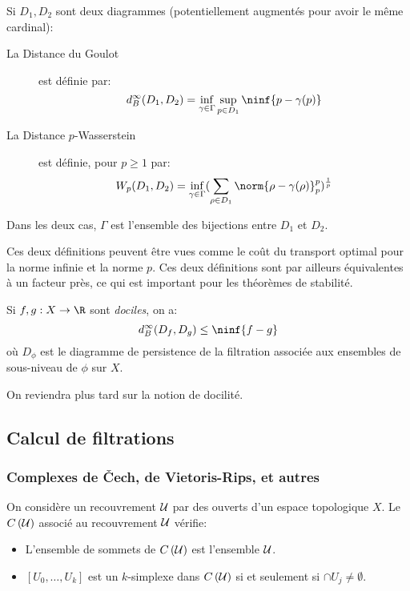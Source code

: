 \begin{definition}
	Si $D_{1}, D_{2}$ sont deux diagrammes (potentiellement augmentés pour avoir le même cardinal):
	\begin{description}
		\item[La Distance du Goulot] est définie par:
		      \begin{equation*}
			      d_{B}^{\infty}(D_{1}, D_{2}) = \inf_{\gamma \in \Gamma} \sup_{p \in D_{1}} \ninf{p - \gamma(p)}
		      \end{equation*}
		\item[La Distance $p$-Wasserstein] est définie, pour $p \geq 1$ par:
		      \begin{equation*}
			      W_{p}(D_{1}, D_{2}) = \inf_{\gamma \in \Gamma} (\sum_{\rho \in D_{1}} \norm{\rho - \gamma(\rho)}_{p}^{p})^{\frac{1}{p}}
		      \end{equation*}
	\end{description}
	Dans les deux cas, $\Gamma$ est l'ensemble des bijections entre $D_{1}$ et $D_{2}$.
\end{definition}

\begin{remarque}
	Ces deux définitions peuvent être vues comme le coût du transport optimal pour la norme infinie et la norme $p$.
	Ces deux définitions sont par ailleurs équivalentes à un facteur près, ce qui est important pour les théorèmes de stabilité.
\end{remarque}

\begin{thm}
	Si $f, g : X \to \R$ sont \emph{dociles}, on a:
	\begin{equation*}
		d_{B}^{\infty}(D_{f}, D_{g}) \leq \ninf{f - g}
	\end{equation*}
	où $D_{\phi}$ est le diagramme de persistence de la filtration associée aux ensembles de sous-niveau de $\phi$ sur $X$.
\end{thm}
On reviendra plus tard sur la notion de docilité.

\subsection{Calcul de filtrations}
\subsubsection{Complexes de \v{C}ech, de Vietoris-Rips, et autres}
\begin{definition}
	On considère un recouvrement $\mathcal{U}$ par des ouverts d'un espace topologique $X$.
	Le  $C\left(\mathcal{U}\right)$ associé au recouvrement $\mathcal{U}$ vérifie:
	\begin{itemize}
		\item L'ensemble de sommets de $C\left(\mathcal{U}\right)$ est l'ensemble $\mathcal{U}$.
		\item $\left[U_{0}, \ldots, U_{k}\right]$ est un $k$-simplexe dans $C\left(\mathcal{U}\right)$ si et seulement si $\cap U_{j} \neq \emptyset$.
	\end{itemize}
\end{definition}

